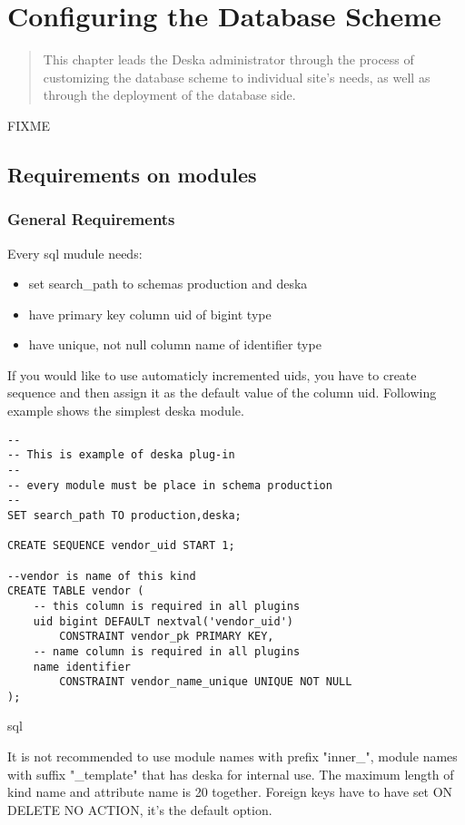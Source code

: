 \documentclass[deska]{subfiles}
\begin{document}
\chapter{Configuring the Database Scheme}
\label{sec:admin-dbscheme}

\begin{abstract}
This chapter leads the Deska administrator through the process of customizing the database scheme to individual site's
needs, as well as through the deployment of the database side.
\end{abstract}

\label{sec:db-scheme-req}
FIXME

\section{Requirements on modules}

\subsection{General Requirements}
Every sql mudule needs:

\begin{itemize}
    \item set search\_path to schemas production and deska
    \item have primary key column uid of bigint type
    \item have unique, not null column name of identifier type
\end{itemize}

If you would like to use automaticly incremented uids, you have to create sequence and then assign it as the default value of the column uid.
Following example shows the simplest deska module.

\begin{verbatim}
--
-- This is example of deska plug-in
--
-- every module must be place in schema production
--
SET search_path TO production,deska;

CREATE SEQUENCE vendor_uid START 1;

--vendor is name of this kind
CREATE TABLE vendor (
    -- this column is required in all plugins
    uid bigint DEFAULT nextval('vendor_uid')
        CONSTRAINT vendor_pk PRIMARY KEY,
    -- name column is required in all plugins
    name identifier
        CONSTRAINT vendor_name_unique UNIQUE NOT NULL
);
\end{verbatim}{sql}

It is not recommended to use module names with prefix "inner\_", module names with suffix "\_template" that has deska for internal use.
The maximum length of kind name and attribute name is 20 together.
Foreign keys have to have set ON DELETE NO ACTION, it's the default option.
\end{document}
